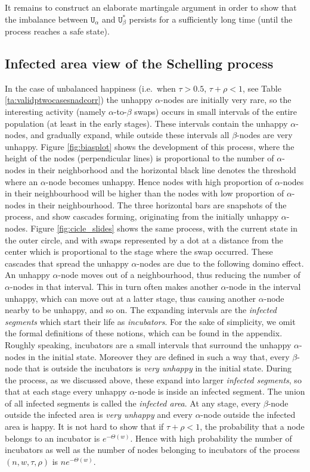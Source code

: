 \documentclass[11pt]{article}
\theoremstyle{plain}
\numberwithin{equation}{subsection}
\newcommand{\unhap}{\mathtt{U}}
\begin{document}
It remains to construct an elaborate martingale argument in order to show that 
the imbalance between $\unhap_{\alpha}$ and $\unhap^{\ast}_{\beta}$
persists for a sufficiently long time (until the process reaches a safe state). 




\subsection{Infected area view of the Schelling process}\label{subse:infareaview}
In the case of unbalanced happiness (i.e.\ when $\tau>0.5$, $\tau+\rho<1$, see Table \ref{ta:validptwocasesnadcorr})
the unhappy $\alpha$-nodes are initially very rare, so the interesting activity (namely $\alpha$-to-$\beta$ swaps) occurs
in small intervals of the entire population (at least in the early stages). 
These intervals contain the unhappy $\alpha$-nodes, and gradually expand, while outside these intervals
all $\beta$-nodes are very unhappy. Figure \ref{fig:biasplot}  
shows the development of this process, where the height of the nodes (perpendicular lines) is proportional to
the number of $\alpha$-nodes in their neighborhood and the horizontal black line denotes the 
threshold where an $\alpha$-node  becomes unhappy.
Hence nodes with high proportion of $\alpha$-nodes in their neighbourhood
will be higher than the nodes with low proportion of $\alpha$-nodes in their neighbourhood. 
The three horizontal bars are snapshots of the process, and show
cascades forming, originating from the initially unhappy $\alpha$-nodes. 
Figure \ref{fig:cicle_slides} 
shows the same process, with the current state in the outer circle, and with swaps represented by a
dot at a distance from the center which is proportional to the stage where the swap occurred.
These cascades that spread the unhappy $\alpha$-nodes are due to the following domino effect. An unhappy 
$\alpha$-node moves out of a neighbourhood, thus reducing the number of $\alpha$-nodes in that interval. This
in turn often makes another $\alpha$-node in the interval unhappy, which can move out at a latter stage, thus
causing another $\alpha$-node nearby to be unhappy, and so on.
The expanding intervals are the {\em infected segments} which start their life as {\em incubators}.
For the sake of simplicity, we omit the formal definitions of these notions, which can be found in the appendix.
Roughly speaking,  incubators are a small intervals that surround  the unhappy $\alpha$-nodes in the initial state.
Moreover they are defined in such a way that, every $\beta$-node that is outside the incubators is {\em very unhappy}
in the initial state.
During the process, as we discussed above, these expand into larger {\em infected segments}, so that at each stage
every unhappy $\alpha$-node is inside an infected segment.
The union of all infected segments is called the 
{\em infected area}. At any stage, every $\beta$-node outside the infected area is {\em very unhappy}
and every $\alpha$-node outside the infected area is happy.
It is not hard to show that if $\tau+\rho<1$, the probability that a node belongs to an incubator is
$e^{-\Theta(w)}$. Hence with high probability  
 the number of incubators as well as the number of nodes belonging to incubators
 of the process $(n,w,\tau,\rho)$ is $n e^{-\Theta(w)}$.
\end{document}
